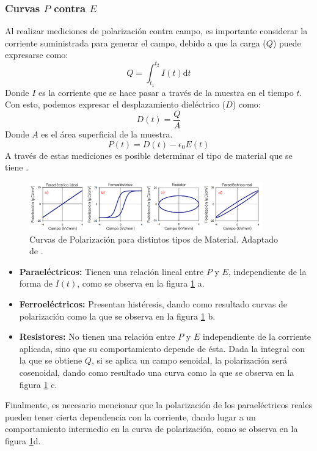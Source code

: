 \documentclass[../main.tex]{subfiles}
\begin{document}
\subsubsection{Curvas \texorpdfstring{$P$}{P} contra \texorpdfstring{$E$}{E}} \label{sec:PEarte}
Al realizar mediciones de polarización contra campo, es importante considerar la corriente suministrada para generar el campo, debido a que la carga ($Q$) puede expresarse como:
\begin{equation}
    Q=\int_{t_1}^{t_2}I(t)\text{d}t
    \label{eq:cargaintensidad}
\end{equation}
Donde $I$ es la corriente que se hace pasar a través de la muestra en el tiempo $t$.
Con esto, podemos expresar el desplazamiento dieléctrico ($D$) como:
\begin{equation}
    D(t)=\dfrac{Q}{A}
    \label{eq:despdielec}
\end{equation}
Donde $A$ es el área superficial de la muestra.
\begin{equation}
    P(t)=D(t)-\epsilon_0E(t)
    \label{eq:polarizacionec}
\end{equation}
A través de estas mediciones es posible determinar el tipo de material que se tiene \cite{Stewart1999}.
\begin{figure}[H]
    \centering
    \includegraphics[width=0.9\textwidth]{fig/PEloop.png}
    \caption{Curvas de Polarización para distintos tipos de Material. Adaptado de \cite{Stewart1999}.}
    \label{fig:PEloop}
\end{figure}
\begin{itemize}
  \item \textbf{Paraeléctricos:} Tienen una relación lineal entre $P$ y $E$, independiente de la forma de $I(t)$, como se observa en la figura \ref{fig:PEloop} a.
  \item \textbf{Ferroeléctricos:} Presentan histéresis, dando como resultado curvas de polarización como la que se observa en la figura \ref{fig:PEloop} b.
  \item \textbf{Resistores:} No tienen una relación entre $P$ y $E$ independiente de la corriente aplicada, sino que su comportamiento depende de ésta. Dada la integral con la que se obtiene $Q$, si se aplica un campo senoidal, la polarización será cosenoidal, dando como resultado una curva como la que se observa en la figura \ref{fig:PEloop} c.
\end{itemize}
Finalmente, es necesario mencionar que la polarización de los paraeléctricos reales pueden tener cierta dependencia con la corriente, dando lugar a un comportamiento intermedio en la curva de polarización, como se observa en la figura \ref{fig:PEloop}d.
\end{document}
